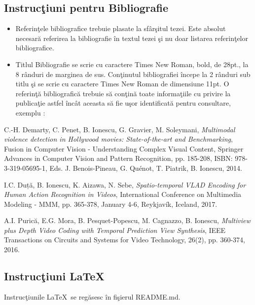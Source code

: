\subsection*{Instruc\c{t}iuni pentru Bibliografie}
\begin{itemize}
  \item Referin\c{t}ele bibliografice trebuie plasate la sf\^{a}r\c{s}itul tezei. Este absolut necesar\u{a} referirea la bibliografie \^{i}n textul tezei \c{s}i nu doar listarea referin\c{t}elor bibliografice.
  \item Titlul Bibliografie se scrie cu caractere Times New Roman, bold, de 28pt., la 8 r\^{a}nduri de marginea de sus. Con\c{t}inutul bibliografiei \^{i}ncepe la 2 r\^{a}nduri sub titlu \c{s}i se scrie cu caractere Times New Roman de dimensiune 11pt. O referin\c{t}\u{a} bibliografic\u{a} trebuie s\u{a} con\c{t}in\u{a} toate informa\c{t}iile cu privire la publica\c{t}ie astfel \^{i}nc\^{a}t aceasta s\u{a} fie u\c{s}or identificat\u{a} pentru consultare, exemplu \cite{demarty2014multimodal, duta2017spatio, purica2015multiview}:
\end{itemize}


\noindent
[1] C.-H. Demarty, C. Penet, B. Ionescu, G. Gravier, M. Soleymani, \textit{Multimodal violence detection in Hollywood movies: State-of-the-art and Benchmarking}, Fusion in Computer Vision - Understanding Complex Visual Content, Springer Advances in Computer Vision and Pattern Recognition, pp. 185-208, ISBN: 978-3-319-05695-1, Eds. J. Benois-Pineau, G. Quénot, T. Piatrik, B. Ionescu, 2014.

\noindent
[2] I.C. Duță, B. Ionescu, K. Aizawa, N. Sebe, \textit{Spatio-temporal VLAD Encoding for Human Action Recognition in Videos}, International Conference on Multimedia Modeling - MMM, pp. 365-378, January 4-6, Reykjavík, Iceland, 2017.

\noindent
[3] A.I. Purică, E.G. Mora, B. Pesquet-Popescu, M. Cagnazzo, B. Ionescu, \textit{Multiview plus Depth Video Coding with Temporal Prediction View Synthesis}, IEEE Transactions on Circuits and Systems for Video Technology, 26(2), pp. 360-374, 2016.

\subsection*{Instruc\c{t}iuni \LaTeX}

Instruc\c{t}iunile \LaTeX~se reg\u{a}sesc \^{i}n fi\c{s}ierul README.md.
\thispagestyle{empty}